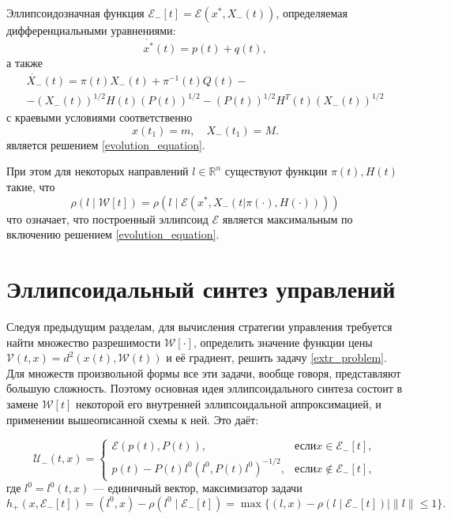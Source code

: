 \begin{theorem}
    Эллипсоидозначная функция \( \mathcal{E}_-[t] = \mathcal{E}(x^*, X_-(t)) \), определяемая
     дифференциальными уравнениями:
    \begin{equation}\label{dif_center}
        \dot{x^*}(t) = p(t) + q(t),
    \end{equation}
    а также
    \begin{equation}\label{dif_matrix}
        \begin{gathered}
            \dot{X_-}(t) = \pi(t) X_-(t) + \pi^{-1}(t) Q(t) - \\
             - (X_-(t))^{1/2} H(t) (P(t))^{1/2} - (P(t))^{1/2} H^T(t) (X_-(t))^{1/2}
        \end{gathered}
    \end{equation}
    с краевыми условиями соответственно
    \begin{equation}\label{dif_boundary}
        x(t_1) = m, \quad X_-(t_1) = M.
    \end{equation}
    является решением \eqref{evolution_equation}.
    
    При этом для некоторых направлений \( l \in \mathbb{R}^n \) существуют функции \( \pi(t), H(t) \) такие,
     что
    \begin{equation*}
        \rho(l \mid \mathcal{W}[t]) = \rho(l \mid \mathcal{E}(x^*, X_-(t | \pi(\cdot), H(\cdot))))
    \end{equation*}
    что означает, что построенный эллипсоид \( \mathcal{E} \) является максимальным по включению
     решением \eqref{evolution_equation}. 
\end{theorem}

\section{Эллипсоидальный синтез управлений}
Следуя предыдущим разделам, для вычисления стратегии управления требуется найти множество разрешимости
 \( \mathcal{W}[\cdot] \), определить значение функции цены \( \mathcal{V}(t,x) = d^2(x(t),
 \mathcal{W}(t)) \) и её градиент, решить задачу \eqref{extr_problem}. Для множеств произвольной формы
 все эти задачи, вообще говоря, представляют большую сложность. Поэтому основная идея эллипсоидального
 синтеза состоит в замене \( \mathcal{W}[t] \) некоторой его внутренней эллипсоидальной аппроксимацией,
 и применении вышеописанной схемы к ней. Это даёт:

\begin{equation}\label{control}
    \mathcal{U}_-(t,x) = 
     \begin{cases}
        \mathcal{E}(p(t), P(t)), & \text{если} x \in \mathcal{E}_-[t], \\
        p(t) - P(t)l^0(l^0, P(t)l^0)^{-1/2}, & \text{если} x \notin \mathcal{E}_-[t],
     \end{cases}
\end{equation}
где \( l^0 = l^0(t,x) \) --- единичный вектор, максимизатор задачи
\begin{equation*}
    h_+(x, \mathcal{E}_-[t]) = (l^0,x) - \rho(l^0 \mid \mathcal{E}_-[t]) = \max\{(l,x) - \rho(l \mid 
     \mathcal{E}_-[t]) \mid \| l \| \le 1 \}.
\end{equation*}

